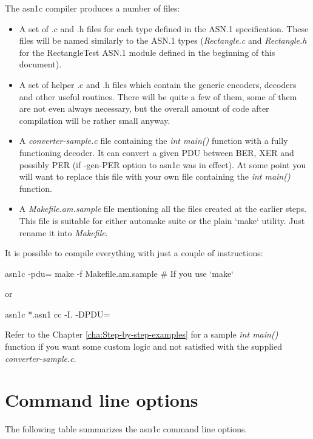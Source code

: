 \documentclass[english,oneside,12pt]{book}
\begin{document}
The asn1c compiler produces a number of files:
\begin{itemize}
\item A set of .c and .h files for each type defined
in the ASN.1 specification. These files will be named similarly to
the ASN.1 types (\emph{Rectangle.c} and \emph{Rectangle.h} for the
RectangleTest ASN.1 module defined in the beginning of this document).
\item A set of helper .c and .h files which contain the generic encoders,
decoders and other useful routines. There will be quite a few of them, some
of them are not even always necessary, but the overall amount of code
after compilation will be rather small anyway.
\item A \emph{converter-sample.c} file containing the \emph{int main()} function with a fully functioning decoder. It can convert a given PDU between BER, XER and possibly PER (if -gen-PER option to asn1c was in effect). At some point you will want to replace this file with your own file containing the \emph{int main()} function.
\item A \emph{Makefile.am.sample} file mentioning all the files created
at the earlier steps. This file is suitable for either automake suite
or the plain `make` utility. Just rename it into \emph{Makefile}.
\end{itemize}
It is possible to compile everything with just a couple of instructions:
\begin{bash}
asn1c -pdu=%
make -f Makefile.am.sample                    # If you use `make`
\end{bash}
or
\begin{bash}
asn1c *.asn1
cc -I. -DPDU=%
\end{bash}
Refer to the Chapter \ref{cha:Step-by-step-examples} for a sample
\emph{int main()} function if you want some custom logic and not satisfied
with the supplied \emph{converter-sample.c}.

\clearpage{}
\section{\label{sec:Command-line-options}Command line options}

The following table summarizes the asn1c command line options.
\end{document}

